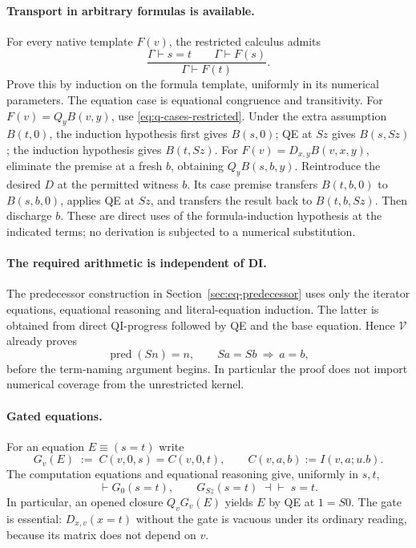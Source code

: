 \paragraph{Transport in arbitrary formulas is available.}
For every native template $F(v)$, the restricted calculus admits
\begin{equation}
 \frac{\Gamma\vdash s=t\qquad\Gamma\vdash F(s)}
      {\Gamma\vdash F(t)}.\tag{L}\label{eq:full-leibniz-restricted}
\end{equation}
Prove this by induction on the formula template, uniformly in its numerical
parameters. The equation case is equational congruence and transitivity.
For $F(v)=Q_yB(v,y)$, use \eqref{eq:q-cases-restricted}. Under the extra
assumption $B(t,0)$, the induction hypothesis first gives $B(s,0)$;
QE at $Sz$ gives $B(s,Sz)$; the induction hypothesis gives $B(t,Sz)$.
For $F(v)=D_{x,y}B(v,x,y)$, eliminate the premise at a fresh $b$, obtaining
$Q_yB(s,b,y)$. Reintroduce the desired $D$ at the permitted witness $b$.
Its case premise transfers $B(t,b,0)$ to $B(s,b,0)$, applies QE at $Sz$,
and transfers the result back to $B(t,b,Sz)$. Then discharge $b$.
These are direct uses of the formula-induction hypothesis at the indicated
terms; no derivation is subjected to a numerical substitution.

\paragraph{The required arithmetic is independent of DI.}
The predecessor construction in Section~\ref{sec:eq-predecessor} uses only
the iterator equations, equational reasoning and literal-equation induction.
The latter is obtained from direct QI-progress followed by QE and the base
equation. Hence $\mathcal V$ already proves
\[
 \operatorname{pred}(Sn)=n,
 \qquad Sa=Sb\ \Longrightarrow\ a=b,
\]
before the term-naming argument begins. In particular the proof does not
import numerical coverage from the unrestricted kernel.

\paragraph{Gated equations.}
For an equation $E\equiv(s=t)$ write
\[
 G_v(E)\;:=\;C(v,0,s)=C(v,0,t),
 \qquad C(v,a,b):=I(v,a;u.b).
\]
The computation equations and equational reasoning give, uniformly in $s,t$,
\[
 \vdash G_0(s=t),\qquad
 G_{Sz}(s=t)\;\dashv\vdash\;s=t.
\]
In particular, an opened closure $Q_vG_v(E)$ yields $E$ by QE at $1=S0$.
The gate is essential: $D_{x,v}(x=t)$ without the gate is vacuous under its
ordinary reading, because its matrix does not depend on $v$.

